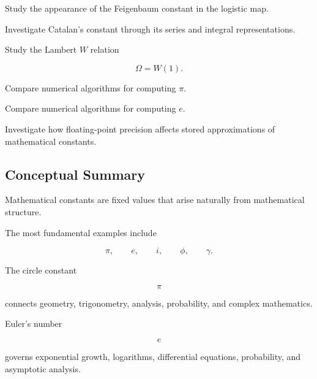 \begin{exercise}[4]
Study the appearance of the Feigenbaum constant in the logistic map.
\end{exercise}

\begin{exercise}[4]
Investigate Catalan's constant through its series and integral
representations.
\end{exercise}

\begin{exercise}[4]
Study the Lambert \(W\) relation

\[
\Omega=W(1).
\]
\end{exercise}

\begin{exercise}[4]
Compare numerical algorithms for computing \(\pi\).
\end{exercise}

\begin{exercise}[4]
Compare numerical algorithms for computing \(e\).
\end{exercise}

\begin{exercise}[4]
Investigate how floating-point precision affects stored approximations of
mathematical constants.
\end{exercise}

\subsection{Conceptual Summary}
\label{subsec:mathematical-constants-summary}

Mathematical constants are fixed values that arise naturally from
mathematical structure.

The most fundamental examples include

\[
\boxed{
\pi,
\qquad
e,
\qquad
i,
\qquad
\phi,
\qquad
\gamma.
}
\]

The circle constant

\[
\boxed{
\pi
}
\]

connects geometry, trigonometry, analysis, probability, and complex
mathematics.

Euler's number

\[
\boxed{
e
}
\]

governs exponential growth, logarithms, differential equations, probability,
and asymptotic analysis.

